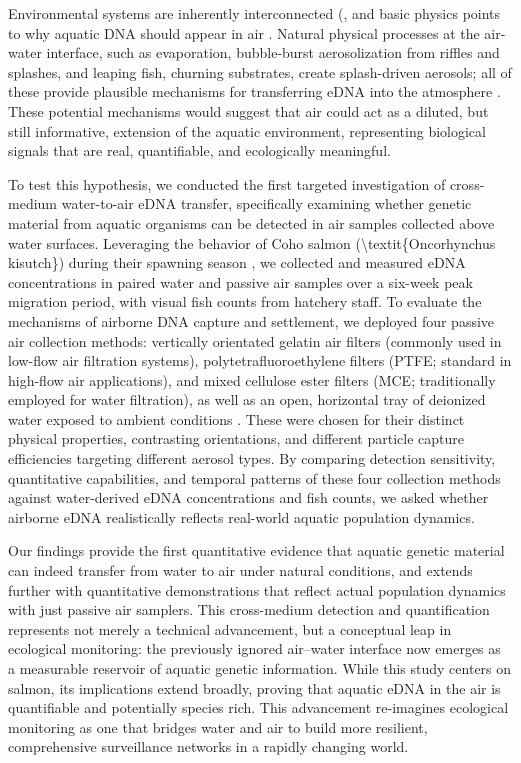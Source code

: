 \documentclass{article}
\begin{document}
Environmental systems are inherently interconnected (\cite{folke2021}, and basic physics points to why aquatic DNA should appear in air \cite{monahan1986,seinfeld2016}. Natural physical processes at the air-water interface, such as evaporation, bubble-burst aerosolization from riffles and splashes, and leaping fish, churning substrates, create splash-driven aerosols; all of these provide plausible mechanisms for transferring eDNA into the atmosphere \cite{duchemin2002,mueller2008,stell2020,vandijk2003}. These potential mechanisms would suggest that air could act as a diluted, but still informative, extension of the aquatic environment, representing biological signals that are real, quantifiable, and ecologically meaningful.

To test this hypothesis, we conducted the first targeted investigation of cross-medium water-to-air eDNA transfer, specifically examining whether genetic material from aquatic organisms can be detected in air samples collected above water surfaces. Leveraging the behavior of Coho salmon (\textbackslash{}textit\{Oncorhynchus kisutch\}) during their spawning season \cite{mueller2008}, we collected and measured eDNA concentrations in paired water and passive air samples over a six-week peak migration period, with visual fish counts from hatchery staff. To evaluate the mechanisms of airborne DNA capture and settlement, we deployed four passive air collection methods: vertically orientated gelatin air filters (commonly used in low-flow air filtration systems), polytetrafluoroethylene filters (PTFE; standard in high-flow air applications), and mixed cellulose ester filters (MCE; traditionally employed for water filtration), as well as an open, horizontal tray of deionized water exposed to ambient conditions \cite{klepke2022}. These were chosen for their distinct physical properties, contrasting orientations, and different particle capture efficiencies targeting different aerosol types. By comparing detection sensitivity, quantitative capabilities, and temporal patterns of these four collection methods against water-derived eDNA concentrations and fish counts, we asked whether airborne eDNA realistically reflects real-world aquatic population dynamics.

Our findings provide the first quantitative evidence that aquatic genetic material can indeed transfer from water to air under natural conditions, and extends further with quantitative demonstrations that reflect actual population dynamics with just passive air samplers. This cross-medium detection and quantification represents not merely a technical advancement, but a conceptual leap in ecological monitoring: the previously ignored air–water interface now emerges as a measurable reservoir of aquatic genetic information. While this study centers on salmon, its implications extend broadly, proving that aquatic eDNA in the air is quantifiable and potentially species rich. This advancement re-imagines ecological monitoring as one that bridges water and air to build more resilient, comprehensive surveillance networks in a rapidly changing world.
\end{document}
